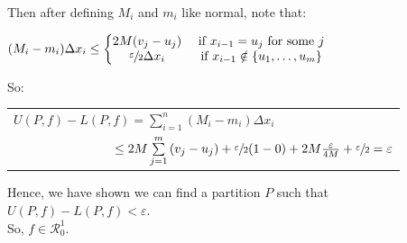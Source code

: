 \documentclass{book}
\newenvironment{myIndent}{%
   \begin{adjustwidth}{2.5em}{0em}%
}{%
   \end{adjustwidth}%
}
\newcommand{\retTwo}{\hfill\bigbreak}
\begin{document}
{\begin{myIndent}
   Then after defining $M_i$ and $m_i$ like normal, note that:

   {\centering $(M_i - m_i)\Delta x_i \leq \left\{
   \begin{matrix}
      2M(v_j - u_j) & \text{ if } x_{i-1} = u_j \text{ for some } j \\
      \sfrac{\varepsilon}{2} \Delta x_i & \text{ if } x_{i-1} \notin \{u_1, \ldots, u_m\}
   \end{matrix}\right.$ \retTwo\par}

   So:\\
   \begin{tabular}{l}
      $U(P, f) - L(P, f) = \sum\limits_{i=1}^n(M_i - m_i)\Delta x_i$ \\ [4pt]
      $\phantom{U(P, f) - L(P, f)} \leq 2M \sum\limits_{j=1}^m\left(v_j - u_j\right) + \sfrac{\varepsilon}{2}(1 - 0) + 2M\frac{\varepsilon}{4M} + \sfrac{\varepsilon}{2} = \varepsilon$\retTwo
   \end{tabular}

   Hence, we have shown we can find a partition $P$ such that $U(P, f) - L(P, f) < \varepsilon$.\\ So, $f \in \mathscr{R}_0^1$.
\end{myIndent}}

\newpage
\end{document}

